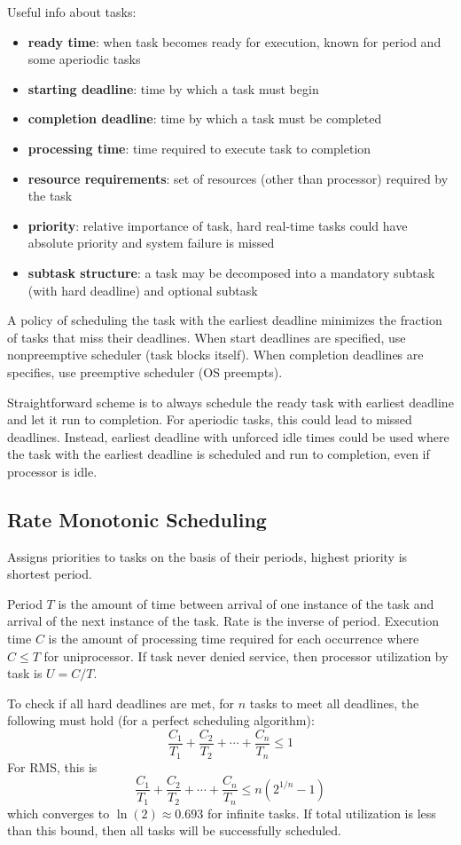\documentclass[11pt]{article}
\begin{document}
Useful info about tasks:
\begin{itemize}
\item \textbf{ready time}: when task becomes ready for execution, known for period and some aperiodic tasks
\item \textbf{starting deadline}: time by which a task must begin
\item \textbf{completion deadline}: time by which a task must be completed
\item \textbf{processing time}: time required to execute task to completion
\item \textbf{resource requirements}: set of resources (other than processor) required by the task
\item \textbf{priority}: relative importance of task, hard real-time tasks could have absolute priority and system failure is missed
\item \textbf{subtask structure}: a task may be decomposed into a mandatory subtask (with hard deadline) and optional subtask
\end{itemize}

A policy of scheduling the task with the earliest deadline minimizes the fraction of tasks that miss their deadlines.
When start deadlines are specified, use nonpreemptive scheduler (task blocks itself).
When completion deadlines are specifies, use preemptive scheduler (OS preempts).

Straightforward scheme is to always schedule the ready task with earliest deadline and let it run to completion.
For aperiodic tasks, this could lead to missed deadlines.
Instead, earliest deadline with unforced idle times could be used where the task with the earliest deadline is scheduled
and run to completion, even if processor is idle.
\subsection{Rate Monotonic Scheduling}
\label{sec:org0a955a8}
Assigns priorities to tasks on the basis of their periods, highest priority is shortest period.

Period \(T\) is the amount of time between arrival of one instance of the task and arrival of the next instance of the task.
Rate is the inverse of period.
Execution time \(C\) is the amount of processing time required for each occurrence where \(C \le T\) for uniprocessor.
If task never denied service, then processor utilization by task is \(U = C/T\).

To check if all hard deadlines are met, for \(n\) tasks to meet all deadlines, the following must hold (for a perfect
scheduling algorithm):
$$
\frac{C_{1}}{T_{1}} + \frac{C_{2}}{T_{2}} + \cdots + \frac{C_{n}}{T_{n}} \le 1
$$
For RMS, this is
$$
\frac{C_{1}}{T_{1}} + \frac{C_{2}}{T_{2}} + \cdots + \frac{C_{n}}{T_{n}} \le n(2^{1/n} - 1)
$$
which converges to \(\ln(2) \approx 0.693\) for infinite tasks.
If total utilization is less than this bound, then all tasks will be successfully scheduled.
\end{document}
